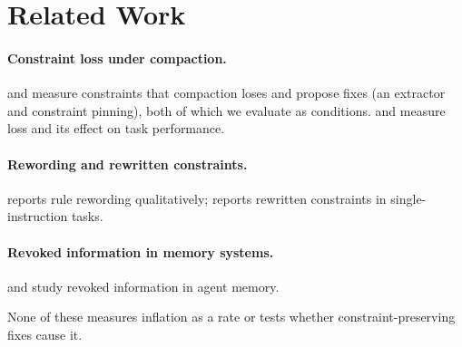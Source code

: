 \section{Related Work}
\label{sec:related}

\paragraph{Constraint loss under compaction.}
\citet{wang2026lostcompaction} and \citet{chen2026governancedecay} measure constraints that compaction loses and
propose fixes (an extractor and constraint pinning), both of which we evaluate as conditions.
\citet{salle2026compactionfriendly} and \citet{sun2026compactbench} measure loss and its effect on task
performance. 

\paragraph{Rewording and rewritten constraints.}
\citet{woolford2026transparentcompaction} reports rule rewording qualitatively; \citet{min2026sjc} reports
rewritten constraints in single-instruction tasks. 

\paragraph{Revoked information in memory systems.}
\citet{todo2026revoked} and \citet{todo2026forgetting} study revoked information
in agent memory. 

None of these measures inflation as a rate or tests whether constraint-preserving fixes cause
it. 

